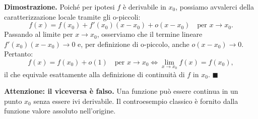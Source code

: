 \noindent\textbf{Dimostrazione.} Poiché per ipotesi $f$ è derivabile in $x_0$, possiamo avvalerci della caratterizzazione locale tramite gli o-piccoli:
\[
    f(x) = f(x_0) + f'(x_0)(x - x_0) + o(x - x_0) \quad \text{per } x \to x_0.
\]
Passando al limite per $x \to x_0$, osserviamo che il termine lineare $f'(x_0)(x - x_0) \to 0$ e, per definizione di o-piccolo, anche $o(x - x_0) \to 0$. Pertanto:
\[
    f(x) = f(x_0) + o(1) \quad \text{per } x \to x_0 \iff \lim_{x \to x_0} f(x) = f(x_0),
\]
il che equivale esattamente alla definizione di continuità di $f$ in $x_0$. $\blacksquare$

\vspace{0.3cm}
\noindent\textbf{Attenzione: il viceversa è falso.} Una funzione può essere continua in un punto $x_0$ senza essere ivi derivabile. Il controesempio classico è fornito dalla funzione valore assoluto nell'origine.


